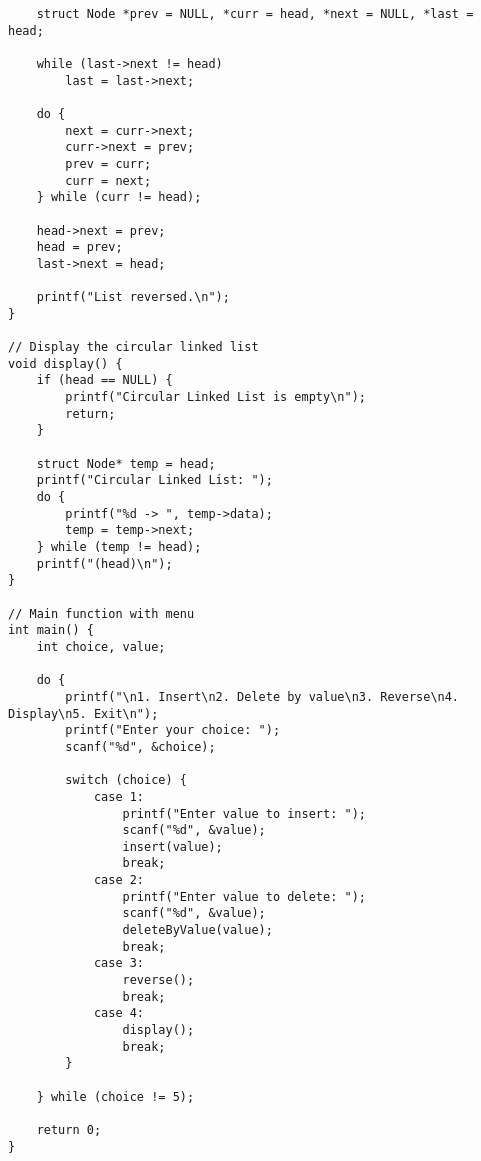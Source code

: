 \documentclass[12pt,a4paper]{article}
\begin{document}
\begin{lstlisting}
    struct Node *prev = NULL, *curr = head, *next = NULL, *last = head;

    while (last->next != head)
        last = last->next;

    do {
        next = curr->next;
        curr->next = prev;
        prev = curr;
        curr = next;
    } while (curr != head);

    head->next = prev;
    head = prev;
    last->next = head;

    printf("List reversed.\n");
}

// Display the circular linked list
void display() {
    if (head == NULL) {
        printf("Circular Linked List is empty\n");
        return;
    }

    struct Node* temp = head;
    printf("Circular Linked List: ");
    do {
        printf("%d -> ", temp->data);
        temp = temp->next;
    } while (temp != head);
    printf("(head)\n");
}

// Main function with menu
int main() {
    int choice, value;

    do {
        printf("\n1. Insert\n2. Delete by value\n3. Reverse\n4. Display\n5. Exit\n");
        printf("Enter your choice: ");
        scanf("%d", &choice);

        switch (choice) {
            case 1:
                printf("Enter value to insert: ");
                scanf("%d", &value);
                insert(value);
                break;
            case 2:
                printf("Enter value to delete: ");
                scanf("%d", &value);
                deleteByValue(value);
                break;
            case 3:
                reverse();
                break;
            case 4:
                display();
                break;
        }

    } while (choice != 5);

    return 0;
}
\end{lstlisting}



\newpage
\end{document}
